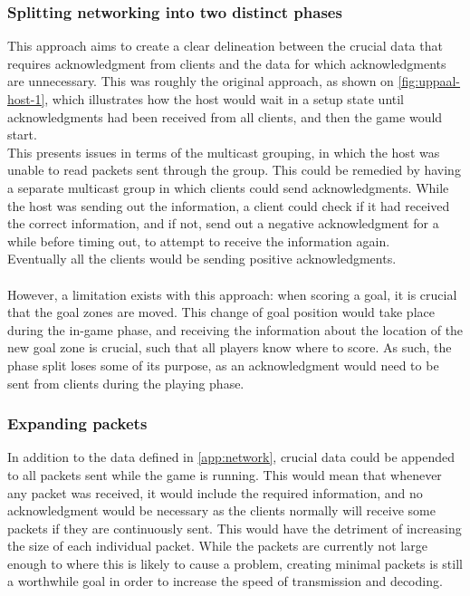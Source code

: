 \subsubsection{Splitting networking into two distinct phases}
This approach aims to create a clear delineation between the crucial data that requires acknowledgment from clients and the data for which acknowledgments are unnecessary.
This was roughly the original approach, as shown on \autoref{fig:uppaal-host-1}, which illustrates how the host would wait in a setup state until acknowledgments had been received from all clients, and then the game would start.
\\
This presents issues in terms of the multicast grouping, in which the host was unable to read packets sent through the group.
This could be remedied by having a separate multicast group in which clients could send acknowledgments.
While the host was sending out the information, a client could check if it had received the correct information, and if not, send out a negative acknowledgment for a while before timing out, to attempt to receive the information again.
\\
Eventually all the clients would be sending positive acknowledgments.
\\\\
However, a limitation exists with this approach: when scoring a goal, it is crucial that the goal zones are moved.
This change of goal position would take place during the in-game phase, and receiving the information about the location of the new goal zone is crucial, such that all players know where to score.
As such, the phase split loses some of its purpose, as an acknowledgment would need to be sent from clients during the playing phase.

\subsubsection{Expanding packets}
In addition to the data defined in \autoref{app:network}, crucial data could be appended to all packets sent while the game is running.
This would mean that whenever any packet was received, it would include the required information, and no acknowledgment would be necessary as the clients normally will receive some packets if they are continuously sent.
This would have the detriment of increasing the size of each individual packet.
While the packets are currently not large enough to where this is likely to cause a problem, creating minimal packets is still a worthwhile goal in order to increase the speed of transmission and decoding.


